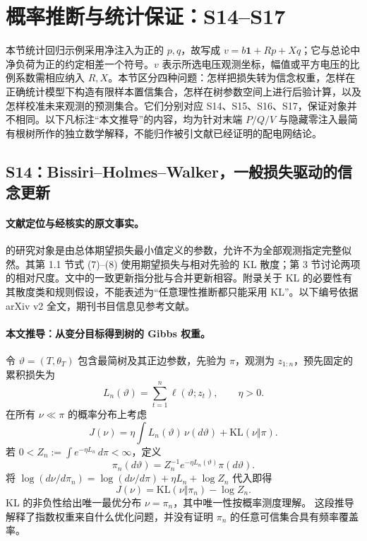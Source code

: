\section{概率推断与统计保证：S14--S17}
\label{sec:statistical}

本节统计回归示例采用净注入为正的 $p,q$，故写成 $v=b\mathbf1+Rp+Xq$；它与总论中净负荷为正的约定相差一个符号。$v$ 表示所选电压观测坐标，幅值或平方电压的比例系数需相应纳入 $R,X$。本节区分四种问题：怎样把损失转为信念权重，怎样在正确统计模型下构造有限样本置信集合，怎样在树参数空间上进行后验计算，以及怎样校准未来观测的预测集合。它们分别对应 S14、S15、S16、S17，保证对象并不相同。以下凡标注“本文推导”的内容，均为针对末端 $P/Q/V$ 与隐藏零注入最简有根树所作的独立数学解释，不能归作被引文献已经证明的配电网结论。

\subsection{S14：Bissiri--Holmes--Walker，一般损失驱动的信念更新}
\label{subsec:S14}

\paragraph{文献定位与经核实的原文事实。}
\citet{S14} 的研究对象是由总体期望损失最小值定义的参数，允许不为全部观测指定完整似然。其第 1.1 节式 (7)--(8) 使用期望损失与相对先验的 KL 散度；第 3 节讨论两项的相对尺度。文中的一致更新指分批与合并更新相容。附录关于 KL 的必要性有其散度类和规则假设，不能表述为“任意理性推断都只能采用 KL”。以下编号依据 arXiv v2 全文，期刊书目信息见参考文献。

\paragraph{本文推导：从变分目标得到树的 Gibbs 权重。}
令 $\vartheta=(T,\theta_T)$ 包含最简树及其正边参数，先验为 $\pi$，观测为 $z_{1:n}$，预先固定的累积损失为
\[
 L_n(\vartheta)=\sum_{t=1}^n\ell(\vartheta;z_t),\qquad \eta>0.
\]
在所有 $\nu\ll\pi$ 的概率分布上考虑
\[
 J(\nu)=\eta\int L_n(\vartheta)\,\nu(d\vartheta)
       +\mathrm{KL}(\nu\Vert\pi).
\]
若 $0<Z_n:=\int e^{-\eta L_n}\,d\pi<\infty$，定义
\[
 \pi_n(d\vartheta)=Z_n^{-1}e^{-\eta L_n(\vartheta)}\pi(d\vartheta).
\]
将 $\log(d\nu/d\pi_n)=\log(d\nu/d\pi)+\eta L_n+\log Z_n$
代入即得
\[
 J(\nu)=\mathrm{KL}(\nu\Vert\pi_n)-\log Z_n.
\]
KL 的非负性给出唯一最优分布 $\nu=\pi_n$，其中唯一性按概率测度理解。
这段推导解释了指数权重来自什么优化问题，并没有证明 $\pi_n$ 的任意可信集合具有频率覆盖率。

